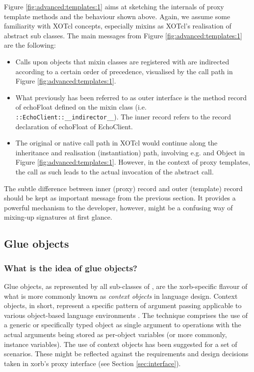 Figure \ref{fig:advanced:templates:1} aims at sketching the internals of proxy template methods and the 
behaviour shown above. Again, we assume some familiarity with XOTcl concepts, especially mixins as 
XOTcl's realisation of abstract sub classes. The main messages from Figure \ref{fig:advanced:templates:1} are the following:
\begin{itemize}
\item Calls upon objects that mixin classes are registered with are indirected according to a certain order 
of precedence, visualised by the call path in Figure  \ref{fig:advanced:templates:1}.
\item What previously has been referred to as outer interface is the method record of echoFloat defined 
on the mixin class (i.e. \lstinline!::EchoClient::__indirector__!). The inner record refers to the record 
declaration of echoFloat of EchoClient.
\item The original or native call path in XOTcl would continue along the inheritance and realisation 
(instantiation) path, involving e.g.  and Object in Figure  \ref{fig:advanced:templates:1}. 
However, in the context of proxy templates, the call as such leads to the actual invocation of the 
abstract call.
\end{itemize}
\begin{hints}
\item The subtle difference between inner (proxy) record and outer (template) record should be kept as important message from the previous section. It provides a powerful mechanism to the developer, however, might be a confusing way of mixing-up signatures at first glance.
\end{hints}
  \subsection{Glue objects}\label{sec:advanced:xorb:gobjects}
  \subsubsection{What is the idea of glue objects?}\label{sec:advanced:xorb:gobjects:what}
  Glue objects, as represented by all sub-classes of , are the xorb-specific flavour of what is more commonly known as \emph{context objects} in language design. Context objects, in short, represent a specific pattern of argument passing applicable to various object-based language environments \cite{zdun:2005b}. The technique comprises the use of a generic or specifically typed object as single argument to operations with the actual arguments being stored as per-object variables (or more commonly, instance variables). The use of context objects has been suggested for a set of scenarios. These might be reflected against the requirements and design decisions taken in xorb's proxy interface (see Section \ref{sec:interface}).
  
